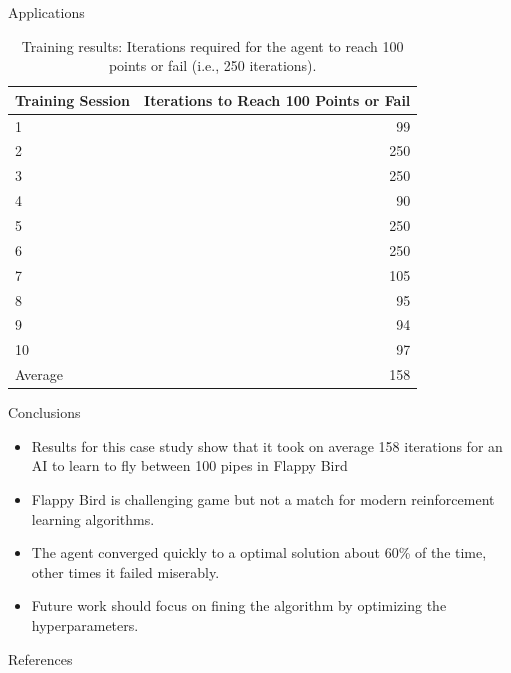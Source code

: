 \documentclass[final,hyperref={pdfpagelabels=false}]{beamer}
\begin{document}
\begin{frame}
\begin{cvprlposter}
\begin{block}{Applications}
\begin{table}[h!]
    \caption{Training results: Iterations required for the agent to reach 100 points or fail (i.e., 250 iterations).}
    \label{tab:training_results}
    \centering
    \small
    \begin{tabular}{|l|r|}
        \hline
        \textbf{Training Session} & \textbf{Iterations to Reach 100 Points or Fail} \\
        \hline
        1 & 99 \\
        2 & 250 \\
        3 & 250 \\
        4 & 90 \\
        5 & 250 \\
        6 & 250 \\
        7 & 105 \\
        8 & 95 \\
        9 & 94 \\
        10 & 97 \\
        \hline
        Average & 158 \\
        \hline
    \end{tabular}
\end{table}
\end{block}

\begin{block}{Conclusions}
\begin{itemize}
    \item Results for this case study show that it took on average 158 iterations for an AI to learn to fly between 100 pipes in Flappy Bird 
	\item Flappy Bird is challenging game but not a match for modern reinforcement learning algorithms.
	\item The agent converged quickly to a optimal solution about 60\% of the time, other times it failed miserably.
	\item Future work should focus on fining the algorithm by optimizing the hyperparameters.
\end{itemize}
\end{block}

\begin{block}{References}
    
    
\end{block}

\end{cvprlposter}
\end{frame}
\end{document}
